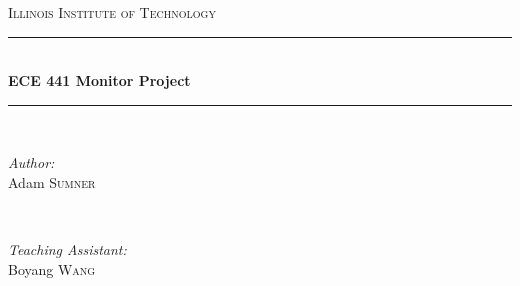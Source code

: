 \documentclass[12pt]{article}
\begin{document}
	
	\begin{titlepage}
		
		\newcommand{\HRule}{\rule{\linewidth}{0.5mm}} %
		
		\center %
		
		
		\textsc{\LARGE Illinois Institute of Technology}\\[1.5cm] %
		
		
		\HRule \\[0.4cm]
		{ \huge \bfseries ECE 441 Monitor Project}\\[0.4cm] %
		\HRule \\[1.5cm]
		
		
		\begin{minipage}{0.4\textwidth}
			\begin{flushleft} \large
				\emph{Author:}\\
				Adam \textsc{Sumner} %
			\end{flushleft}
		\end{minipage}
		~
		\begin{minipage}{0.4\textwidth}
			\begin{flushright} \large
				\emph{Teaching Assistant:} \\
				Boyang \textsc{Wang} %
			\end{flushright}
		\end{minipage}\\[4cm]
		

\end{titlepage}
\end{document}
